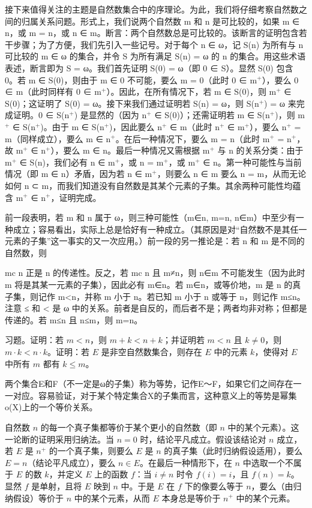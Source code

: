 \documentclass[12pt,a4paper]{ctexbook}
\theoremstyle{definition}
\theoremstyle{remark}
\begin{document}
{接下来值得关注的主题是自然数集合中的序理论。为此，我们将仔细考察自然数之间的归属关系问题。形式上，我们说两个自然数 m 和 n 是可比较的，如果 m ∈ n，或 m = n，或 n ∈ m。断言：两个自然数总是可比较的。该断言的证明包含若干步骤；为了方便，我们先引入一些记号。对于每个 n ∈ ω，记 S(n) 为所有与 n 可比较的 m ∈ ω 的集合，并令 S 为所有满足 S(n) = ω 的 n 的集合。用这些术语表述，断言即为 S = ω。我们首先证明 S(0) = ω（即 0 ∈ S）。显然 S(0) 包含 0。若 m ∈ S(0)，则由于 m ∈ 0 不可能，要么 m = 0（此时 0 ∈ m$^{+}$），要么 0 ∈ m（此时同样有 0 ∈ m$^{+}$）。因此，在所有情况下，若 m ∈ S(0)，则 m$^{+}$ ∈ S(0)；这证明了 S(0) = ω。接下来我们通过证明若 S(n) = ω，则 S(n$^{+}$) = ω 来完成证明。0 ∈ S(n$^{+}$) 是显然的（因为 n$^{+}$ ∈ S(0)）；还需证明若 m ∈ S(n$^{+}$)，则 m$^{+}$ ∈ S(n$^{+}$)。由于 m ∈ S(n$^{+}$)，因此要么 n$^{+}$ ∈ m（此时 n$^{+}$ ∈ m$^{+}$），要么 n$^{+}$ = m（同样成立），要么 m ∈ n$^{+}$。在后一种情况下，要么 m = n（此时 m$^{+}$ = n$^{+}$，故 m$^{+}$ ∈ n$^{+}$），要么 m ∈ n。最后一种情况又需根据 m$^{+}$ 与 n 的关系分类：由于 m$^{+}$ ∈ S(n)，我们必有 n ∈ m$^{+}$，或 n = m$^{+}$，或 m$^{+}$ ∈ n。第一种可能性与当前情况（即 m ∈ n）矛盾，因为若 n ∈ m$^{+}$，则要么 n ∈ m 要么 n = m，从而无论如何 n ⊂ m，而我们知道没有自然数是其某个元素的子集。其余两种可能性均蕴含 m$^{+}$ ∈ n$^{+}$，证明完成。

前一段表明，若 m 和 n 属于 ω，则三种可能性（m∈n, m=n, n∈m）中至少有一种成立；容易看出，实际上总是恰好有一种成立。（其原因是对“自然数不是其任一元素的子集”这一事实的又一次应用。）前一段的另一推论是：若 n 和 m 是不同的自然数，则

mc n 正是 n 的传递性。反之，若 mc n 且 m≠n，则 n∈m 不可能发生（因为此时 m 将是其某一元素的子集），因此必有 m∈n。若 m∈n，或等价地，m 是 n 的真子集，则记作 m<n，并称 m 小于 n。若已知 m 小于 n 或等于 n，则记作 m≤n。注意 ≤ 和 < 是 ω 中的关系。前者是自反的，而后者不是；两者均非对称；但都是传递的。若 m≤n 且 n≤m，则 m=n。

习题。证明：若 \(m < n\)，则 \(m + k < n + k\)；并证明若 \(m < n\) 且 \(k \neq 0\)，则 \(m \cdot k < n \cdot k\)。证明：若 \(E\) 是非空自然数集合，则存在 \(E\) 中的元素 \(k\)，使得对 \(E\) 中所有 \(m\) 都有 \(k \leq m\)。

两个集合E和F（不一定是ω的子集）称为等势，记作E～F，如果它们之间存在一一对应。容易验证，对于某个特定集合X的子集而言，这种意义上的等势是幂集o(X)上的一个等价关系。

自然数 \(n\) 的每一个真子集都等价于某个更小的自然数（即 \(n\) 中的某个元素）。这一论断的证明采用归纳法。当 \(n=0\) 时，结论平凡成立。假设该结论对 \(n\) 成立，若 \(E\) 是 \(n^+\) 的一个真子集，则要么 \(E\) 是 \(n\) 的真子集（此时归纳假设适用），要么 \(E=n\)（结论平凡成立），要么 \(n \in E\)。在最后一种情形下，在 \(n\) 中选取一个不属于 \(E\) 的数 \(k\)，并定义 \(E\) 上的函数 \(f\)：当 \(i \neq n\) 时令 \(f(i)=i\)，且 \(f(n)=k\)。显然 \(f\) 是单射，且将 \(E\) 映到 \(n\) 中。于是 \(E\) 在 \(f\) 下的像要么等于 \(n\)，要么（由归纳假设）等价于 \(n\) 中的某个元素，从而 \(E\) 本身总是等价于 \(n^+\) 中的某个元素。

}
\end{document}
